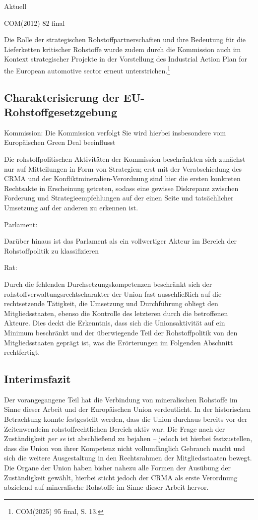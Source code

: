 \documentclass[12pt,a4paper,oneside]{book} %
\begin{document}
Aktuell 

COM(2012) 82 final 

Die Rolle der strategischen Rohstoffpartnerschaften und ihre Bedeutung für die Lieferketten kritischer Rohstoffe wurde zudem durch die Kommission auch im Kontext strategischer Projekte in der Vorstellung des Industrial Action Plan for the European automotive sector erneut unterstrichen.\footnote{COM(2025) 95 final, S. 13.}

	
	
\subsection{Charakterisierung der EU-Rohstoffgesetzgebung}

Kommission: Die Kommission verfolgt 
Sie wird hierbei insbesondere vom Europäischen Green Deal beeinflusst

Die rohstoffpolitischen Aktivitäten der Kommission beschränkten sich zunächst nur auf Mitteilungen in Form von Strategien; erst mit der Verabschiedung des CRMA und der Konfliktmineralien-Verordnung sind hier die ersten konkreten Rechtsakte in Erscheinung getreten, sodass eine gewisse Diskrepanz zwischen Forderung und Strategieempfehlungen auf der einen Seite und tatsächlicher Umsetzung auf der anderen zu erkennen ist.

Parlament: 

Darüber hinaus ist das Parlament als ein vollwertiger Akteur im Bereich der Rohstoffpolitik zu klassifizieren

Rat:



Durch die fehlenden Durchsetzungskompetenzen beschränkt sich der rohstoffverwaltungsrechtscharakter der Union fast ausschließlich auf die rechtsetzende Tätigkeit, die Umsetzung und Durchführung obliegt den Mitgliedsstaaten, ebenso die Kontrolle des letzteren durch die betroffenen Akteure. Dies deckt die Erkenntnis, dass sich die Unionsaktivität auf ein Minimum beschränkt und der überwiegende Teil der Rohstoffpolitik von den Mitgliedsstaaten geprägt ist, was die Erörterungen im Folgenden Abschnitt rechtfertigt.
	
	
	\subsection{Interimsfazit}
	Der vorangegangene Teil hat die Verbindung von mineralischen Rohstoffe im Sinne dieser Arbeit und der Europäischen Union verdeutlicht. In der historischen Betrachtung konnte festgestellt werden, dass die Union durchaus bereits vor der \glqq Zeitenwende\grqq im rohstoffrechtlichen Bereich aktiv war.
	Die Frage nach der Zuständigkeit \textit{per se} ist abschließend zu bejahen -- jedoch ist hierbei festzustellen, dass die Union von ihrer Kompetenz nicht vollumfänglich Gebrauch macht und sich die weitere Ausgestaltung in den Rechtsrahmen der Mitgliedsstaaten bewegt.
	Die Organe der Union haben bisher nahezu alle Formen der Ausübung der Zuständigkeit gewählt, hierbei sticht jedoch der CRMA als erste Verordnung abzielend auf mineralische Rohstoffe im Sinne dieser Arbeit hervor.
	
\end{document}
